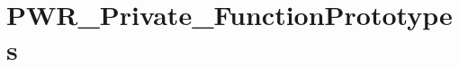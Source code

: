 \hypertarget{group___p_w_r___private___function_prototypes}{}\section{P\+W\+R\+\_\+\+Private\+\_\+\+Function\+Prototypes}
\label{group___p_w_r___private___function_prototypes}
